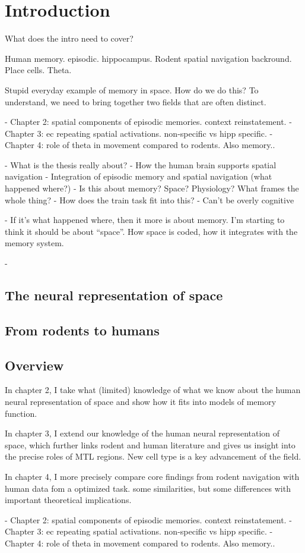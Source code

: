 \chapter{Introduction}



What does the intro need to cover?

Human memory. episodic. hippocampus.
Rodent spatial navigation backround. Place cells. Theta.


Stupid everyday example of memory in space. How do we do this? To understand, we need to bring together two fields that are often distinct. 








- Chapter 2: spatial components of episodic memories. context reinstatement.
- Chapter 3: ec repeating spatial activations. non-specific vs hipp specific.
- Chapter 4: role of theta in movement compared to rodents. Also memory..


- What is the thesis really about?
- How the human brain supports spatial navigation
- Integration of episodic memory and spatial navigation (what happened where?)
- Is this about memory? Space? Physiology? What frames the whole thing?
- How does the train task fit into this?
- Can't be overly cognitive

- If it's what happened where, then it more is about memory. I'm starting to think it should be about ``space''. How space is coded, how it integrates with the memory system.

- 




\section{The neural representation of space}
\section{From rodents to humans}
\section{Overview}

In chapter 2, I take what (limited) knowledge of what we know about the human neural representation of space and show how it fits into models of memory function.

In chapter 3, I extend our knowledge of the human neural representation of space, which further links rodent and human literature and gives us insight into the precise roles of MTL regions. New cell type is a key advancement of the field.

In chapter 4, I more precisely compare core findings from rodent navigation with human data fom a optimized task. some similarities, but some differences with important theoretical implications.

- Chapter 2: spatial components of episodic memories. context reinstatement.
- Chapter 3: ec repeating spatial activations. non-specific vs hipp specific.
- Chapter 4: role of theta in movement compared to rodents. Also memory..
